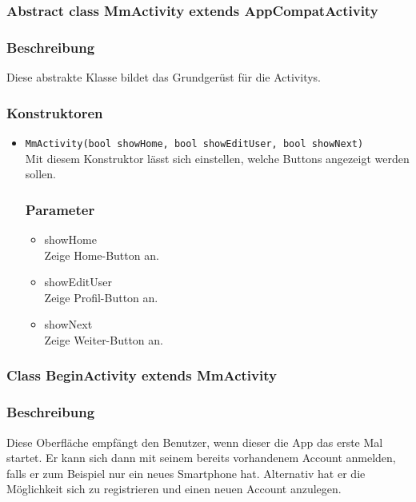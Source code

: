 \documentclass[a4paper]{scrreprt}
\begin{document}
\subsubsection{Abstract class MmActivity extends AppCompatActivity}
\subsubsection*{Beschreibung}
Diese abstrakte Klasse bildet das Grundgerüst für die Activitys.

\subsubsection*{Konstruktoren}
\begin{addmargin}[25pt]{0pt}
\begin{itemize}

\item \texttt{MmActivity(bool showHome, bool showEditUser, bool showNext)}\\
	
	Mit diesem Konstruktor lässt sich einstellen, welche Buttons angezeigt werden sollen.

	\subsubsection*{Parameter}
	\begin{itemize}
	\item showHome \\
		Zeige Home-Button an.
	\item showEditUser \\
		Zeige Profil-Button an.
	\item showNext \\
		Zeige Weiter-Button an.
	\end{itemize}

\end{itemize}
\end{addmargin}


\subsubsection{Class BeginActivity extends MmActivity}
\subsubsection*{Beschreibung}
Diese Oberfläche empfängt den Benutzer, wenn dieser die App das erste Mal startet. Er kann sich dann mit seinem bereits vorhandenem Account anmelden, falls er zum Beispiel nur ein neues Smartphone hat. Alternativ hat er die Möglichkeit sich zu registrieren und einen neuen Account anzulegen.
\end{document}
